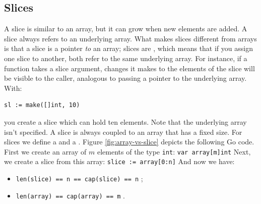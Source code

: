 \subsection{Slices}
\label{sec:slices}
A slice is similar to an array, but it can grow when new elements
are added.
A slice always refers to an underlying array. What makes slices different
from
arrays is that a slice is a pointer \emph{to} an array;
slices are , 
which means that if you assign one slice to
another, both refer to the same underlying array. For instance, if a
function takes a slice argument, changes it makes to the elements of the
slice will be visible to the caller, analogous to passing a pointer to
the underlying array. With:
\begin{lstlisting}
sl := make([]int, 10)
\end{lstlisting}
you create a slice which can hold ten elements. Note that the
underlying array isn't specified.
A slice is always coupled to an array that has
a fixed size. For slices we define a  and a
. 
Figure \ref{fig:array-vs-slice} depicts the following Go code.
First we create an array of $m$ elements of the type \lstinline{int}:
\lstinline{var array[m]int}\newline
Next, we create a slice from this array:
\lstinline{slice := array[0:n]}\newline
And now we have:
\begin{itemize}
\item{\lstinline{len(slice) == n == cap(slice) == n}{} ;}
\item{\lstinline{len(array) == cap(array) == m}{} .}
\end{itemize}
